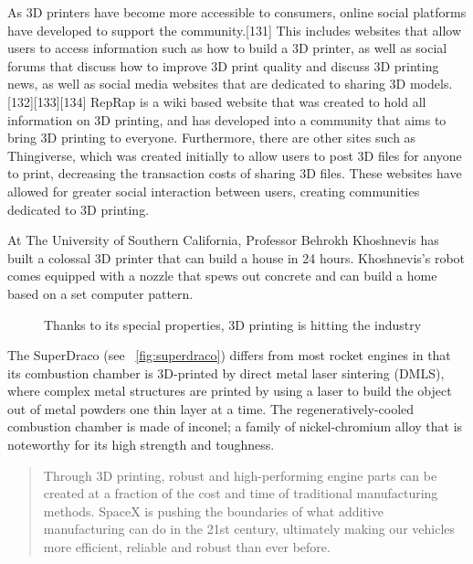 As 3D printers have become more accessible to consumers, online social platforms have developed to support the community.[131] This includes websites that allow users to access information such as how to build a 3D printer, as well as social forums that discuss how to improve 3D print quality and discuss 3D printing news, as well as social media websites that are dedicated to sharing 3D models.[132][133][134]
RepRap is a wiki based website that was created to hold all information on 3D printing, and has developed into a community that aims to bring 3D printing to everyone. Furthermore, there are other sites such as Thingiverse, which was created initially to allow users to post 3D files for anyone to print, decreasing the transaction costs of sharing 3D files. These websites have allowed for greater social interaction between users, creating communities dedicated to 3D printing.

At The University of Southern California, Professor Behrokh Khoshnevis has built a colossal 3D printer that can build a house in 24 hours. Khoshnevis's robot comes equipped with a nozzle that spews out concrete and can build a home based on a set computer pattern.



\begin{figure}[ht]
\centering
    \hfil
    \caption{Thanks to its special properties, 3D printing is hitting the industry}
    \label{fig:industrie_printing}
\end{figure}

The SuperDraco (see \figurename~\ref{fig:superdraco}) differs from most rocket engines in that its combustion chamber is 3D-printed by direct metal laser sintering (DMLS), where complex metal structures are printed by using a laser to build the object out of metal powders one thin layer at a time. The regeneratively-cooled combustion chamber is made of inconel; a family of nickel-chromium alloy that is noteworthy for its high strength and toughness.

\begin{quotation}
    Through 3D printing, robust and high-performing engine parts can be created at a fraction of the cost and time of traditional manufacturing methods. SpaceX is pushing the boundaries of what additive manufacturing can do in the 21st century, ultimately making our vehicles more efficient, reliable and robust than ever before.
\end{quotation}


